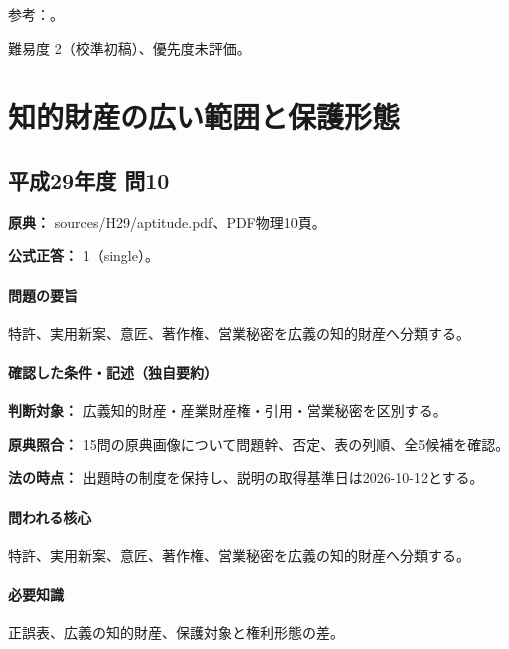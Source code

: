 \par 参考：\cite{ip_patent_statute,ip_novelty_grace2018}。

\par 難易度 2（校準初稿）、優先度未評価。

\section{知的財産の広い範囲と保護形態}

\subsection{平成29年度 問10}
\label{q:h29-reg-apt-10}

\noindent\textbf{原典：} sources/H29/aptitude.pdf、PDF物理10頁。

\textbf{公式正答：} 1（single）。

\paragraph{問題の要旨} 特許、実用新案、意匠、著作権、営業秘密を広義の知的財産へ分類する。

\paragraph{確認した条件・記述（独自要約）}\mbox{}\par

\noindent\textbf{判断対象：} 広義知的財産・産業財産権・引用・営業秘密を区別する。\par

\noindent\textbf{原典照合：} 15問の原典画像について問題幹、否定、表の列順、全5候補を確認。\par

\noindent\textbf{法の時点：} 出題時の制度を保持し、説明の取得基準日は2026-10-12とする。\par

\paragraph{問われる核心} 特許、実用新案、意匠、著作権、営業秘密を広義の知的財産へ分類する。

\paragraph{必要知識} 正誤表、広義の知的財産、保護対象と権利形態の差。

